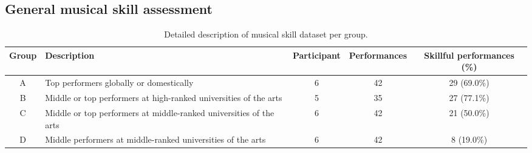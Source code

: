\subsection{General musical skill assessment}
\begin{table*}[h!]
  \caption{Detailed description of musical skill dataset per group.}
  \begin{tabular}{c|p{5cm}ccc}
    \toprule
    Group & Description & Participant & Performances & Skillful performances (\%) \\
    \midrule
    A     & Top performers globally or domestically & 6 & 42 & 29 (69.0\%)\\ \hline
    B     & Middle or top performers \newline at high-ranked universities of the arts & 5 & 35 & 27 (77.1\%)\\ \hline
    C     & Middle or top performers \newline at middle-ranked universities of the arts & 6 & 42 & 21 (50.0\%)\\ \hline
    D     & Middle performers \newline at middle-ranked universities of the arts & 6 & 42 & 8 (19.0\%)\\ \hline
  \end{tabular}
  \label{skill_dataset_group_details}
\end{table*}

